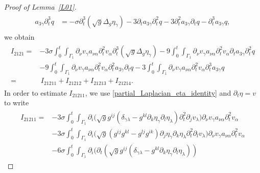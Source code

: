 \documentclass[10pt,reqno]{amsart}
\theoremstyle{plain}
\theoremstyle{definition}
\numberwithin{equation}{section}
\newcommand{\al}{\alpha}
\newcommand{\ga}{\gamma}
\newcommand{\Ga}{\Gamma}
\newcommand{\de}{\delta}
\newcommand{\la}{\lambda}
\newcommand{\si}{\sigma}
\begin{document}
\begin{proof}[Proof of Lemma~\ref{L01}]
\begin{align}
\begin{split}
a_{3\ga}  \partial^3_t q
& = - \si \partial^3_t(\sqrt{g} \Delta_g \eta_\ga) 
-3 \partial_t a_{3 \ga} \partial^2_t q
-3 \partial^2_t a_{3 \ga} \partial_t q
- \partial^3_t a_{3 \ga} q,
\end{split}
\nonumber
\end{align}
we obtain
\begin{align}
\begin{split}
I_{2121}  = & 
- 3\si 
\int_0^t \int_{\Ga_1}  \partial_\nu v_\ga a_{\nu \al} \partial^2_t v_\al
\partial^3_t(\sqrt{g} \Delta_g \eta_\ga)
-9 \int_0^t \int_{\Ga_1}  \partial_\nu v_\ga a_{\nu \al} \partial^2_t v_\al \partial_t a_{3 \ga} \partial^2_t q
\\
&
-9 \int_0^t \int_{\Ga_1}  \partial_\nu v_\ga a_{\nu \al} \partial^2_t v_\al \partial^2_t a_{3 \ga} \partial_t q
-3\int_0^t \int_{\Ga_1}  \partial_\nu v_\ga a_{\nu \al} \partial^2_t v_\al \partial^3_t a_{3 \ga}q
\\
= & \,
I_{21211} + 
I_{21212} + 
I_{21213} + 
I_{21214}. 
\end{split}
\label{I_2121_break_up}
\end{align}
In order to estimate $I_{21211}$, 
we use \eqref{partial_Laplacian_eta_identity} 
and $\partial_{t}\eta=v$
to write
\begin{align}
\begin{split}
I_{21211}
 = & 
- 3\si \int_0^t \int_{\Ga_1}
\partial_i \big (
\sqrt{g} g^{ij} (\de_{\ga\la} -g^{kl} \partial_k \eta_\ga \partial_l \eta_\la)
\partial^2_t \partial_j v_\la 
\big )
\partial_\nu v_\ga a_{\nu \al} \partial^2_t v_\al
\\
&
-3\si 
\int_0^t \int_{\Ga_1}
\partial_i \big (
 \sqrt{g}(g^{ij} g^{kl} - g^{lj}g^{ik} ) \partial_j \eta_\ga \partial_k\eta_\la 
\partial^2_t \partial_l v_\la 
\big )
\partial_\nu v_\ga a_{\nu \al} \partial^2_t v_\al
\\
&
- 6\si \int_0^t \int_{\Ga_1}
\partial_i \big (
\partial_t( \sqrt{g} g^{ij} (\de_{\ga\la} -g^{kl} \partial_k \eta_\ga \partial_l \eta_\la) )

\end{split}
\end{align}
\end{proof}
\end{document}
